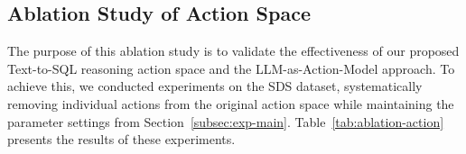 




\begin{table}[t!]
\centering
\vspace{-1em}
\caption{Ablation Study on Action Space.}
\label{tab:ablation-action}
\vspace{-.5em}
\end{table}

\subsection{Ablation Study of Action Space}
\label{subsec:exp-action-space}
The purpose of this ablation study is to validate the effectiveness of our proposed Text-to-SQL reasoning action space and the LLM-as-Action-Model approach.
To achieve this, we conducted experiments on the SDS dataset, systematically removing individual actions from the original action space while maintaining the parameter settings from Section~\ref{subsec:exp-main}. Table~\ref{tab:ablation-action} presents the results of these experiments.

